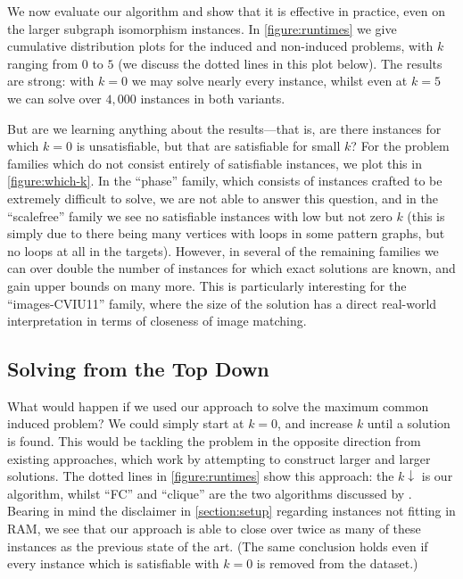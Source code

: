 \documentclass[letterpaper]{article}
\newcommand{\citet}[1]{\citeauthor{#1} \shortcite{#1}}
\theoremstyle{definition}
\begin{document}
We now evaluate our algorithm and show that it is effective in practice, even on the larger subgraph
isomorphism instances. In \cref{figure:runtimes} we give cumulative distribution plots for the
induced and non-induced problems, with $k$ ranging from $0$ to $5$ (we discuss the dotted lines in
this plot below). The results are strong: with $k = 0$ we may solve nearly every instance, whilst
even at $k = 5$ we can solve over $4,000$ instances in both variants.

But are we learning anything about the results---that is, are there instances for which $k = 0$ is
unsatisfiable, but that are satisfiable for small $k$? For the problem families which do not consist
entirely of satisfiable instances, we plot this in \cref{figure:which-k}. In the ``phase'' family,
which consists of instances crafted to be extremely difficult to solve, we are not able to answer
this question, and in the ``scalefree'' family we see no satisfiable instances with low but not zero
$k$ (this is simply due to there being many vertices with loops in some pattern graphs, but no loops
at all in the targets). However, in several of the remaining families we can over double the number
of instances for which exact solutions are known, and gain upper bounds on many more. This is
particularly interesting for the ``images-CVIU11'' family, where the size of the solution has a
direct real-world interpretation in terms of closeness of image matching.

\subsection{Solving from the Top Down}

What would happen if we used our approach to solve the maximum common induced problem? We could
simply start at $k = 0$, and increase $k$ until a solution is found. This would be tackling the
problem in the opposite direction from existing approaches, which work by attempting to construct
larger and larger solutions. The dotted lines in \cref{figure:runtimes} show this approach: the $k
\downarrow$ is our algorithm, whilst ``FC'' and ``clique'' are the two algorithms discussed by
\citet{DBLP:conf/cp/McCreeshNPS16}.  Bearing in mind the disclaimer in \cref{section:setup}
regarding instances not fitting in RAM, we see that our approach is able to close over twice as many
of these instances as the previous state of the art. (The same conclusion holds even if every
instance which is satisfiable with $k = 0$ is removed from the dataset.)
\end{document}
